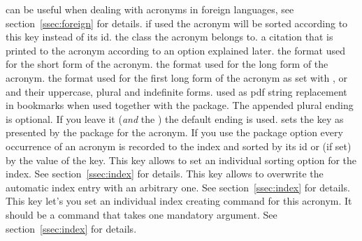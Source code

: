 \documentclass[DIV10,toc=index,toc=bib,hyperfootnotes=false]{cnpkgdoc}
\begin{document}
\begin{beschreibung}
 \newline
   can be useful when dealing with acronyms in foreign languages, see
   section~\ref{ssec:foreign} for details.
 \newline
   if used the acronym will be sorted according to this key instead of its \acs{id}.
 \newline
   the class the acronym belongs to.
 \newline
   a citation that is printed to the acronym according to an option explained later.
 \newline
   the format used for the short form of the acronym.
 \newline
   the format used for the long form of the acronym.
 \newline
   the format used for the first long form of the acronym as set with ,
    or  and their uppercase, plural and indefinite forms.
 \newline
   used as \acs{pdf} string replacement in bookmarks when used together with the
    package. The appended plural ending is optional. If you
   leave it (\emph{and} the \code{/}) the default ending is used.
 \newline
   sets the  key as presented by the  package
   for the acronym.
 \newline
   If you use the package option  every occurrence
   of an acronym is recorded to the index and sorted by its \ac{id} or (if set)
   by the value of the  key. This key allows to set an individual
   sorting option for the index. See section~\ref{ssec:index} for details.
 \newline
   This key allows to overwrite the automatic index entry with
   an arbitrary one. See section~\ref{ssec:index} for details.
 \newline
   This key let's you set an individual index creating command
   for this acronym. It should be a command that takes one mandatory argument.
   See section~\ref{ssec:index} for details.
\end{beschreibung}
\end{document}
